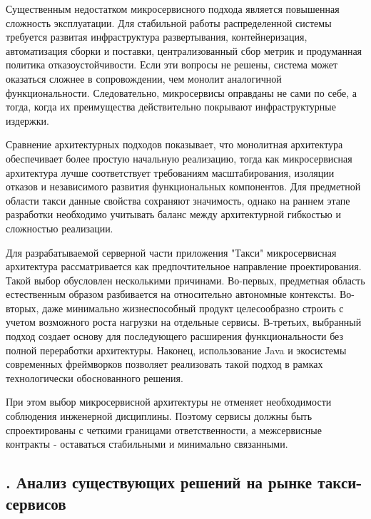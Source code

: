 {\par \redline Существенным недостатком микросервисного подхода является повышенная сложность эксплуатации. Для стабильной работы распределенной системы требуется развитая инфраструктура развертывания, контейнеризация, автоматизация сборки и поставки, централизованный сбор метрик и продуманная политика отказоустойчивости. Если эти вопросы не решены, система может оказаться сложнее в сопровождении, чем монолит аналогичной функциональности. Следовательно, микросервисы оправданы не сами по себе, а тогда, когда их преимущества действительно покрывают инфраструктурные издержки.

\par \redline Сравнение архитектурных подходов показывает, что монолитная архитектура обеспечивает более простую начальную реализацию, тогда как микросервисная архитектура лучше соответствует требованиям масштабирования, изоляции отказов и независимого развития функциональных компонентов. Для предметной области такси данные свойства сохраняют значимость, однако на раннем этапе разработки необходимо учитывать баланс между архитектурной гибкостью и сложностью реализации.

\par \redline Для разрабатываемой серверной части приложения "Такси"{} микросервисная архитектура рассматривается как предпочтительное направление проектирования. Такой выбор обусловлен несколькими причинами. Во-первых, предметная область естественным образом разбивается на относительно автономные контексты. Во-вторых, даже минимально жизнеспособный продукт целесообразно строить с учетом возможного роста нагрузки на отдельные сервисы. В-третьих, выбранный подход создает основу для последующего расширения функциональности без полной переработки архитектуры. Наконец, использование Java и экосистемы современных фреймворков позволяет реализовать такой подход в рамках технологически обоснованного решения.

\par \redline При этом выбор микросервисной архитектуры не отменяет необходимости соблюдения инженерной дисциплины. Поэтому сервисы должны быть спроектированы с четкими границами ответственности, а межсервисные контракты - оставаться стабильными и минимально связанными.
	
	\par
}

\subtitlespace

\subsection*{
	\gostTitleFont
	\redline
	\thechaptercntr .\thesubchaptercntr \spc
	Анализ существующих решений на рынке такси-сервисов
} \addtocounter{subchaptercntr}{1}

